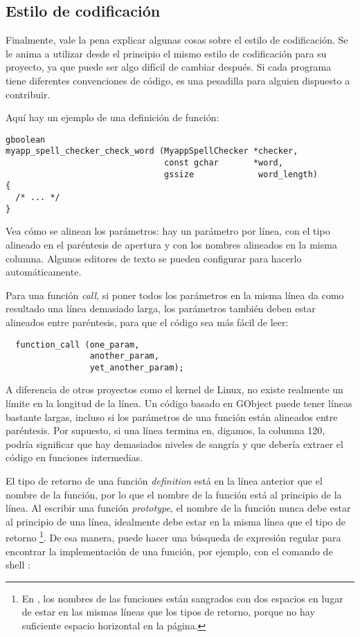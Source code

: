 \subsection{Estilo de codificación}
Finalmente, vale la pena explicar algunas cosas sobre el estilo de codificación. Se le anima a utilizar desde el principio el mismo estilo de codificación para su proyecto, ya que puede ser algo difícil de cambiar después. Si cada programa tiene diferentes convenciones de código, es una pesadilla para alguien dispuesto a contribuir.

Aquí hay un ejemplo de una definición de función:
\begin{lstlisting}
gboolean
myapp_spell_checker_check_word (MyappSpellChecker *checker,
                                const gchar       *word,
                                gssize             word_length)
{
  /* ... */
}
\end{lstlisting}

Vea cómo se alinean los parámetros: hay un parámetro por línea, con el tipo alineado en el paréntesis de apertura y con los nombres alineados en la misma columna. Algunos editores de texto se pueden configurar para hacerlo automáticamente.

Para una función \emph{call}, si poner todos los parámetros en la misma línea da como resultado una línea demasiado larga, los parámetros también deben estar alineados entre paréntesis, para que el código sea más fácil de leer:
\begin{lstlisting}
  function_call (one_param,
                 another_param,
                 yet_another_param);
\end{lstlisting}

A diferencia de otros proyectos como el kernel de Linux, no existe realmente un límite en la longitud de la línea. Un código basado en GObject puede tener líneas bastante largas, incluso si los parámetros de una función están alineados entre paréntesis. Por supuesto, si una línea termina en, digamos, la columna 120, podría significar que hay demasiados niveles de sangría y que debería extraer el código en funciones intermedias.

El tipo de retorno de una función \emph{definition} está en la línea anterior que el nombre de la función, por lo que el nombre de la función está al principio de la línea. Al escribir una función \emph{prototype}, el nombre de la función nunca debe estar al principio de una línea, idealmente debe estar en la misma línea que el tipo de retorno \footnote{En , los nombres de las funciones están sangrados con dos espacios en lugar de estar en las mismas líneas que los tipos de retorno, porque no hay suficiente espacio horizontal en la página.}. De esa manera, puede hacer una búsqueda de expresión regular para encontrar la implementación de una función, por ejemplo, con el comando de shell :

